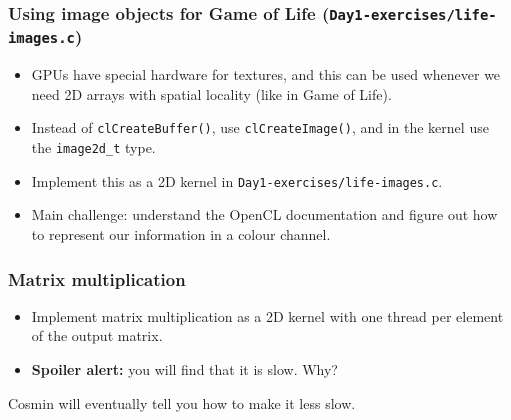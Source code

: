 \documentclass{beamer}
\begin{document}
\begin{frame}
  \frametitle{Using image objects for Game of Life (\texttt{Day1-exercises/life-images.c})}

  \begin{itemize}
  \item GPUs have special hardware for textures, and this can be used
    whenever we need 2D arrays with spatial locality (like in Game of
    Life).

  \item Instead of \texttt{clCreateBuffer()}, use
    \texttt{clCreateImage()}, and in the kernel use the
    \texttt{image2d\_t} type.

  \item Implement this as a 2D kernel in
    \texttt{Day1-exercises/life-images.c}.

  \item Main challenge: understand the OpenCL documentation and figure
    out how to represent our information in a colour channel.
  \end{itemize}
\end{frame}

\begin{frame}
  \frametitle{Matrix multiplication}

  \begin{itemize}
  \item Implement matrix multiplication as a 2D kernel with one thread
    per element of the output matrix.
  \item \textbf{Spoiler alert:} you will find that it is slow.  Why?
  \end{itemize}

  Cosmin will eventually tell you how to make it less slow.

\end{frame}
\end{document}
